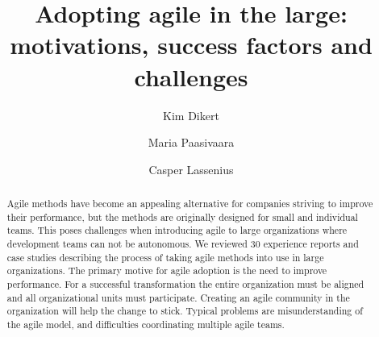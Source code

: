 \documentclass[lnbip]{svmultln}
\begin{document}

\mainmatter


\title{Adopting agile in the large: motivations, success factors and challenges}


\author{Kim Dikert \and Maria Paasivaara \and Casper Lassenius}



\maketitle



\begin{abstract}

Agile methods have become an appealing alternative for companies striving to
improve their performance, but the methods are originally designed for small and
individual teams. This poses challenges when introducing agile to large
organizations where development teams can not be autonomous. We reviewed 30
experience reports and case studies describing the process of taking agile
methods into use in large organizations. The primary motive for agile adoption
is the need to improve performance. For a successful transformation the entire
organization must be aligned and all organizational units must participate.
Creating an agile community in the organization will help the change to stick.
Typical problems are misunderstanding of the agile model, and difficulties
coordinating multiple agile teams.

\end{abstract}


\end{document}
